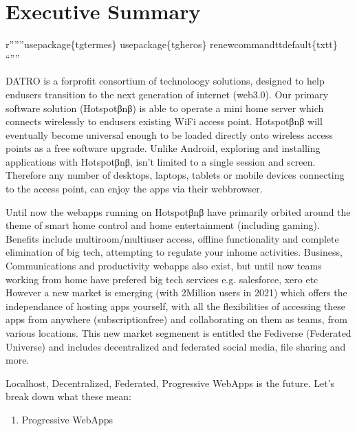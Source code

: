 \documentclass[letterpaper,10pt,openany,oneside,english]{sphinxmanual}
\begin{document}
\chapter{Executive Summary}
\label{\detokenize{executivesummary:executive-summary}}\label{\detokenize{executivesummary::doc}}
\sphinxAtStartPar
r”””usepackage\{tgtermes\}
usepackage\{tgheros\}
renewcommandttdefault\{txtt\}
“””

\sphinxAtStartPar
DATRO is a for\sphinxhyphen{}profit consortium of technoloogy solutions, designed to help end\sphinxhyphen{}users transition to the next generation of internet (web3.0).
Our primary software solution (Hotspotβnβ) is able to operate a mini home server which connects wirelessly to end\sphinxhyphen{}users existing Wi\sphinxhyphen{}Fi access point.
Hotspotβnβ will eventually become universal enough to be loaded directly onto wireless access points as a free software upgrade.
Unlike Android, exploring and installing applications with Hotspotβnβ, isn’t limited to a single session and screen.
Therefore any number of desktops, laptops, tablets or mobile devices connecting to the access point, can enjoy the apps via their web\sphinxhyphen{}browser.

\sphinxAtStartPar
Until now the webapps running on Hotspotβnβ have primarily orbited around the theme of smart home control and home entertainment (including gaming).
Benefits include multi\sphinxhyphen{}room/multi\sphinxhyphen{}user access, offline functionality and complete elimination of big tech, attempting to regulate your in\sphinxhyphen{}home activities.
Business, Communications and productivity webapps also exist, but until now teams working from home have prefered big tech services e.g. salesforce, xero etc
However a new market is emerging (with 2Million users in 2021) which offers the independance of hosting apps yourself,
with all the flexibilities of accessing these apps from anywhere (subscription\sphinxhyphen{}free) and collaborating on them as teams, from various locations.
This new market segmenent is entitled the Fediverse (Federated Universe) and includes decentralized and federated social media, file sharing and more.

\sphinxAtStartPar
Localhost, Decentralized, Federated, Progressive WebApps is the future. Let’s break down what these mean:
\begin{enumerate}
%
\item {} 
\sphinxAtStartPar
Progressive WebApps

\end{enumerate}
\end{document}
